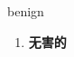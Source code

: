 
\begin{frame}
{\huge benign}
\begin{center}
\begin{enumerate}\Large
  \item \textbf{无害的}
\end{enumerate}
\end{center}
\end{frame}
